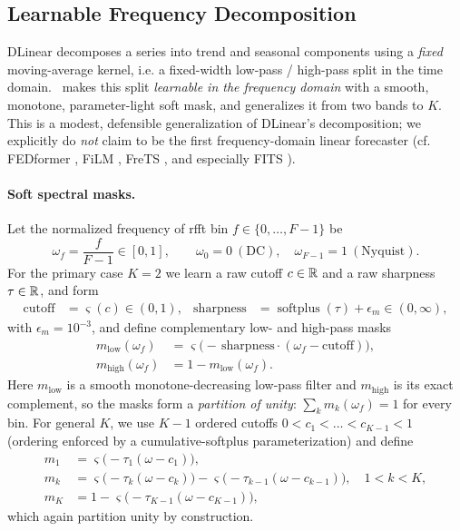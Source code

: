 \subsection{Learnable Frequency Decomposition}
\label{sec:method:freq}

DLinear \citep{zeng2023dlinear} decomposes a series into trend and seasonal
components using a \emph{fixed} moving-average kernel, i.e. a fixed-width
low-pass / high-pass split in the time domain. \method\ makes this split
\emph{learnable in the frequency domain} with a smooth, monotone,
parameter-light soft mask, and generalizes it from two bands to $K$. This is a
modest, defensible generalization of DLinear's decomposition; we explicitly do
\emph{not} claim to be the first frequency-domain linear forecaster
(cf. FEDformer \citep{zhou2022fedformer}, FiLM \citep{zhou2022film}, FreTS
\citep{yi2023frets}, and especially FITS \citep{xu2024fits}).

\paragraph{Soft spectral masks.}
Let the normalized frequency of rfft bin $f \in \{0,\dots,F-1\}$ be
\begin{equation}
\omega_f = \frac{f}{F-1} \in [0,1],
\qquad \omega_0 = 0\ (\text{DC}),\quad \omega_{F-1} = 1\ (\text{Nyquist}).
\end{equation}
For the primary case $K{=}2$ we learn a raw cutoff $c \in \mathbb{R}$ and a raw
sharpness $\tau \in \mathbb{R}$, and form
\begin{align}
\mathrm{cutoff} &= \varsigma(c) \in (0,1), &
\mathrm{sharpness} &= \operatorname{softplus}(\tau) + \epsilon_m \in (0,\infty),
\end{align}
with $\epsilon_m = 10^{-3}$, and define complementary low- and high-pass masks
\begin{align}
m_{\mathrm{low}}(\omega_f) &= \varsigma\!\big(-\,\mathrm{sharpness}\cdot(\omega_f - \mathrm{cutoff})\big),
  \label{eq:mask-low}\\
m_{\mathrm{high}}(\omega_f) &= 1 - m_{\mathrm{low}}(\omega_f).
  \label{eq:mask-high}
\end{align}
Here $m_{\mathrm{low}}$ is a smooth monotone-decreasing low-pass filter and
$m_{\mathrm{high}}$ is its exact complement, so the masks form a
\emph{partition of unity}: $\sum_k m_k(\omega_f) = 1$ for every bin. For general
$K$, we use $K-1$ ordered cutoffs $0 < c_1 < \dots < c_{K-1} < 1$ (ordering
enforced by a cumulative-softplus parameterization) and define
\begin{align}
m_1 &= \varsigma\!\big(-\tau_1(\omega - c_1)\big), \nonumber\\
m_k &= \varsigma\!\big(-\tau_k(\omega - c_k)\big)
       - \varsigma\!\big(-\tau_{k-1}(\omega - c_{k-1})\big),
       \quad 1 < k < K, \label{eq:mask-general}\\
m_K &= 1 - \varsigma\!\big(-\tau_{K-1}(\omega - c_{K-1})\big), \nonumber
\end{align}
which again partition unity by construction.

